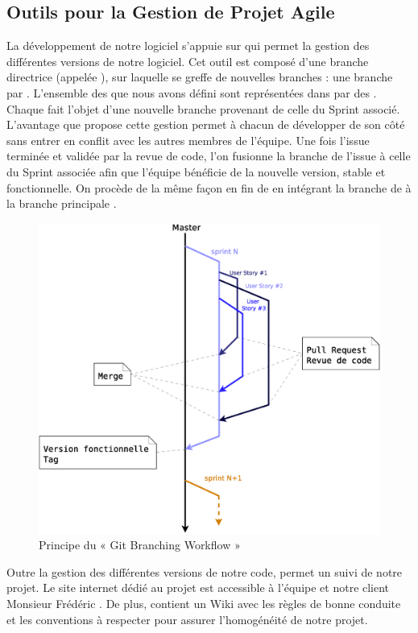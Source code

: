 \subsection{Outils pour la Gestion de Projet Agile}
La développement de notre logiciel s’appuie sur  qui permet la gestion des différentes versions de notre logiciel. 
Cet outil est composé d’une branche directrice (appelée ), sur laquelle se greffe de nouvelles branches : une branche par . L’ensemble des  que nous avons défini sont représentées dans  par des . Chaque  fait l’objet d’une nouvelle branche provenant de celle du Sprint associé. L’avantage que propose cette gestion permet à chacun de développer de son côté sans entrer en conflit avec les autres membres de l’équipe. Une fois l’issue terminée et validée par la revue de code, l’on fusionne la branche de l’issue à celle du Sprint associée afin que l’équipe bénéficie de la nouvelle version, stable et fonctionnelle. On procède de la même façon en fin de  en intégrant la branche de  à la branche principale .

\begin{figure}[H]
	\centering
	\includegraphics*[width=12cm]{screens/BranchingWorkflow.eps}
	\caption{Principe du « Git Branching Workflow »}
\end{figure}

Outre la gestion des différentes versions de notre code,  permet un suivi de notre projet. Le site internet  dédié au projet est accessible à l’équipe et notre client Monsieur Frédéric . 
De plus,  contient un Wiki avec les règles de bonne conduite et les conventions à respecter pour assurer l'homogénéité de notre projet. 


